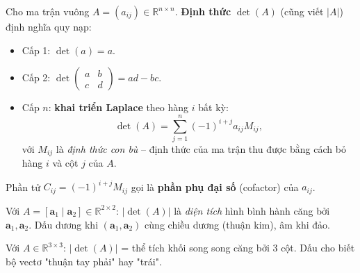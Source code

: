 \documentclass[12pt,a4paper]{article}
\begin{document}
\begin{dinhnghia}
  Cho ma trận vuông $A = (a_{ij}) \in \mathbb{R}^{n\times n}$. \textbf{Định thức} $\det(A)$ (cũng viết $|A|$) định nghĩa quy nạp:
  \begin{itemize}
    \item Cấp 1: $\det(a) = a$.
    \item Cấp 2: $\det\begin{pmatrix}a & b\\c & d\end{pmatrix} = ad - bc$.
    \item Cấp $n$: \textbf{khai triển Laplace} theo hàng $i$ bất kỳ:
    \[
      \det(A) = \sum_{j=1}^{n} (-1)^{i+j} a_{ij} M_{ij},
    \]
    với $M_{ij}$ là \emph{định thức con bù} -- định thức của ma trận thu được bằng cách bỏ hàng $i$ và cột $j$ của $A$.
  \end{itemize}
  Phần tử $C_{ij} = (-1)^{i+j} M_{ij}$ gọi là \textbf{phần phụ đại số} (cofactor) của $a_{ij}$.
\end{dinhnghia}

\begin{ynghia}[title={Hình học $\det$: diện tích / thể tích có dấu}]
Với $A = [\mathbf{a}_1 \mid \mathbf{a}_2] \in \mathbb{R}^{2\times 2}$: $|\det(A)|$ là \emph{diện tích} hình bình hành căng bởi $\mathbf{a}_1, \mathbf{a}_2$. Dấu dương khi $(\mathbf{a}_1, \mathbf{a}_2)$ cùng chiều dương (thuận kim), âm khi đảo.

Với $A \in \mathbb{R}^{3\times 3}$: $|\det(A)|$ = thể tích khối song song căng bởi 3 cột. Dấu cho biết bộ vectơ "thuận tay phải" hay "trái".
\end{ynghia}

\begin{center}
\end{center}
\end{document}
